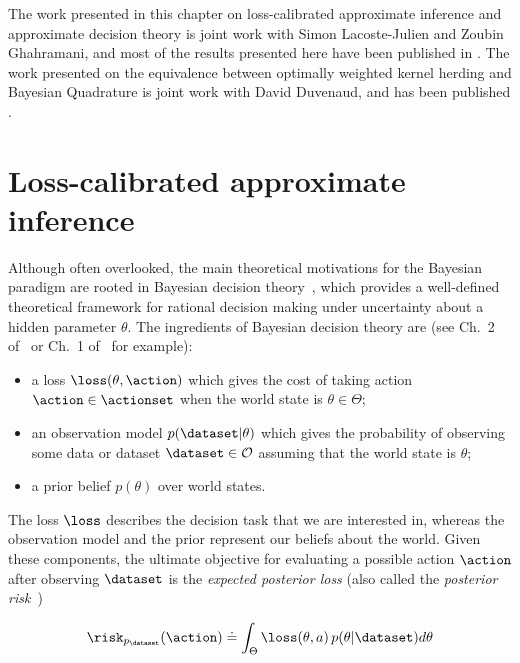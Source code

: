 The work presented in this chapter on loss-calibrated approximate inference and approximate decision theory is joint work with Simon Lacoste-Julien and Zoubin Ghahramani, and most of the results presented here have been published in \cite{losscalibrated}.
The work presented on the equivalence between optimally weighted kernel herding and Bayesian Quadrature is joint work with David Duvenaud, and has been published \cite{losscalibrated}.

\section{Loss-calibrated approximate inference}

Although often overlooked, the main theoretical motivations for the Bayesian paradigm are rooted in Bayesian decision theory~\cite{berger85decision}, which provides a well-defined theoretical framework for rational decision making under uncertainty about a hidden parameter $\theta$. The ingredients of Bayesian decision theory are (see Ch.~2 of~\cite{robert01choice} or Ch.~1 of~\cite{berger85decision} for example):
\vspace{-.3cm}
\begin{itemize}
  \item a loss $\loss(\theta,\action)$ which gives the cost of taking action $\action \in \actionset$ when the world state is $\theta \in \Theta$; %
  \item an observation model $p(\dataset|\theta)$ which gives the probability of observing some data or dataset $\dataset \in \mathcal{O}$ assuming that the world state is $\theta$;
  \item a prior belief $p(\theta)$ over world states.
\end{itemize}

The loss $\loss$ describes the decision task that we are interested in, whereas the observation model and the prior represent our beliefs about the world. Given these components, the ultimate objective for evaluating a possible action $\action$ after observing $\dataset$ is the \emph{expected posterior loss} (also called the \emph{posterior risk}~\cite{schervish95theory})

\begin{equation}
	\risk_{p_\dataset}(\action) \doteq \int_\Theta \loss(\theta, a) \, p(\theta|\dataset) d\theta
\end{equation}

